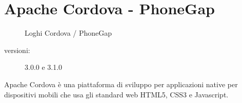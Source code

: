 \section{Apache Cordova - PhoneGap}
\begin{figure}[htb]
\centering
{} \quad
{}
\caption{Loghi Cordova / PhoneGap}
\label{fig:cordova phonegap}
\end{figure}

\begin{description}
\item[versioni:] 3.0.0 e 3.1.0
\end{description}

Apache Cordova è una piattaforma di sviluppo per applicazioni native per dispositivi mobili che usa gli standard web \acs{HTML5}, \acs{CSS3} e Javascript.

